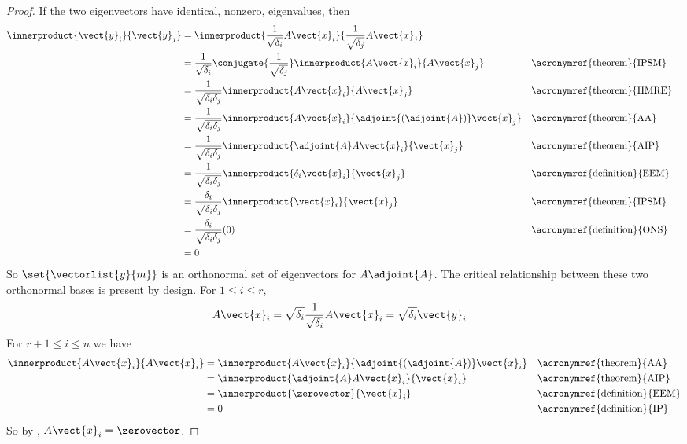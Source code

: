 \begin{proof}
If the two eigenvectors have identical, nonzero, eigenvalues, then
%
\begin{align*}
\innerproduct{\vect{y}_i}{\vect{y}_j}
&=
\innerproduct{\frac{1}{\sqrt{\delta_i}}A\vect{x}_i}{\frac{1}{\sqrt{\delta_j}}A\vect{x}_j}\\
%
&=
\frac{1}{\sqrt{\delta_i}}\conjugate{\frac{1}{\sqrt{\delta_j}}}
\innerproduct{A\vect{x}_i}{A\vect{x}_j}&&
\text{\acronymref{theorem}{IPSM}}\\
%
&=
\frac{1}{\sqrt{\delta_i\delta_j}}
\innerproduct{A\vect{x}_i}{A\vect{x}_j}&&
\text{\acronymref{theorem}{HMRE}}\\
%
&=
\frac{1}{\sqrt{\delta_i\delta_j}}
\innerproduct{A\vect{x}_i}{\adjoint{\left(\adjoint{A}\right)}\vect{x}_j}&&\text{\acronymref{theorem}{AA}}\\
%
&=
\frac{1}{\sqrt{\delta_i\delta_j}}
\innerproduct{\adjoint{A}A\vect{x}_i}{\vect{x}_j}
&&\text{\acronymref{theorem}{AIP}}\\
%
&=
\frac{1}{\sqrt{\delta_i\delta_j}}
\innerproduct{\delta_i\vect{x}_i}{\vect{x}_j}
&&\text{\acronymref{definition}{EEM}}\\
%
&=
\frac{\delta_i}{\sqrt{\delta_i\delta_j}}
\innerproduct{\vect{x}_i}{\vect{x}_j}
&&\text{\acronymref{theorem}{IPSM}}\\
%
&=
\frac{\delta_i}{\sqrt{\delta_i\delta_j}}(0)
&&\text{\acronymref{definition}{ONS}}\\
%
&=0
%
\end{align*}
%
So $\set{\vectorlist{y}{m}}$ is an orthonormal set of eigenvectors for $A\adjoint{A}$.  The critical relationship between these two orthonormal bases is present by design.  For $1\leq i\leq r$,
%
\begin{align*}
A\vect{x}_i
&=\sqrt{\delta_i}\frac{1}{\sqrt{\delta_i}}A\vect{x}_i
=\sqrt{\delta_i}\vect{y}_i
%
\end{align*}
%
For $r+1\leq i\leq n$ we have
%
\begin{align*}
\innerproduct{A\vect{x}_i}{A\vect{x}_i}
&=\innerproduct{A\vect{x}_i}{\adjoint{\left(\adjoint{A}\right)}\vect{x}_i}
&&\text{\acronymref{theorem}{AA}}\\
%
&=\innerproduct{\adjoint{A}A\vect{x}_i}{\vect{x}_i}
&&\text{\acronymref{theorem}{AIP}}\\
%
&=\innerproduct{\zerovector}{\vect{x}_i}
&&\text{\acronymref{definition}{EEM}}\\
%
&=0
&&\text{\acronymref{definition}{IP}}
%
\end{align*}
%
So by , $A\vect{x}_i=\zerovector$.
%
\end{proof}
